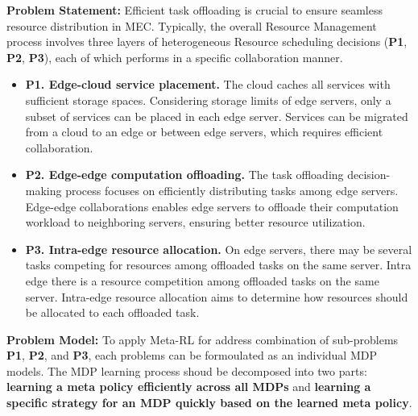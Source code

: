 \documentclass[12pt]{article}
\begin{document}
\vspace{3mm}
 
 

\noindent\textbf{\large Problem Statement: } Efficient task offloading is crucial to ensure seamless resource distribution in MEC.
Typically, the overall Resource Management process involves three layers of heterogeneous Resource scheduling decisions (\textbf{P1}, \textbf{P2}, \textbf{P3}), each of which performs in a specific collaboration manner. \vspace{-2mm}

\begin{itemize}
	
	\item \textbf{P1. Edge-cloud service placement. } %
	The cloud caches all services with sufficient storage spaces. Considering storage limits of edge servers, only a subset of services can be placed in each edge server. Services can be migrated from a cloud to an edge or between edge servers, which requires efficient collaboration.\vspace{-2mm}
	
	\item\textbf{P2. Edge-edge computation offloading. }  The task offloading decision-making process focuses on efficiently distributing tasks among edge servers. Edge-edge collaborations enables edge servers to offloade their computation workload to neighboring servers, ensuring better resource utilization. \vspace{-2mm}
	
	\item\textbf{P3. Intra-edge resource allocation. } On edge servers, there may be several tasks competing for resources among offloaded tasks on the same server. Intra edge there is a resource competition among offloaded tasks on the same server. Intra-edge resource allocation aims to determine how resources should be allocated to each offloaded task.
	
\end{itemize}

\vspace{0mm}

\noindent\textbf{\large Problem Model: } To apply Meta-RL for address combination of sub-problems  \textbf{P1},  \textbf{P2}, and \textbf{P3}, each problems can be formoulated as an individual MDP models. The MDP learning process shoud be decomposed into two parts: \textbf{learning a meta policy efficiently across all MDPs} and \textbf{learning a specific strategy for an MDP quickly based on the learned meta policy}.
\noindent
\end{document}
